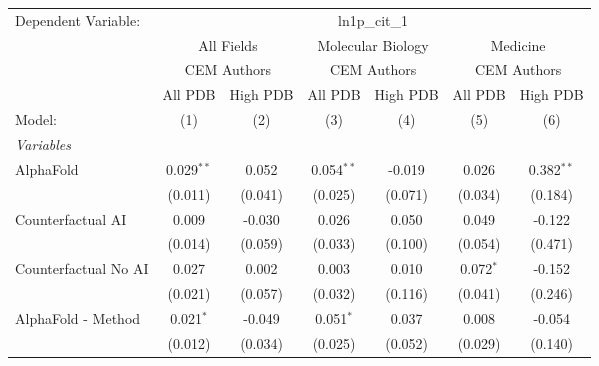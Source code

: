 \begingroup
\centering
\begin{tabular}{lcccccc}
   \tabularnewline \midrule \midrule
   Dependent Variable: & \multicolumn{6}{c}{ln1p\_cit\_1}\\
 & \multicolumn{2}{c}{All Fields} & \multicolumn{2}{c}{Molecular Biology} & \multicolumn{2}{c}{Medicine} \\
\cmidrule(lr){2-3} \cmidrule(lr){4-5} \cmidrule(lr){6-7}
 & \multicolumn{2}{c}{CEM Authors} & \multicolumn{2}{c}{CEM Authors} & \multicolumn{2}{c}{CEM Authors} \\
\cmidrule(lr){2-3} \cmidrule(lr){4-5} \cmidrule(lr){6-7}
 & \multicolumn{1}{c}{All PDB} & \multicolumn{1}{c}{High PDB} & \multicolumn{1}{c}{All PDB} & \multicolumn{1}{c}{High PDB} & \multicolumn{1}{c}{All PDB} & \multicolumn{1}{c}{High PDB} \\
\cmidrule(lr){2-2} \cmidrule(lr){3-3} \cmidrule(lr){4-4} \cmidrule(lr){5-5} \cmidrule(lr){6-6} \cmidrule(lr){7-7}
   Model:                                                     & (1)          & (2)     & (3)          & (4)          & (5)           & (6)\\  
   \midrule
   \emph{Variables}\\
   AlphaFold                                                  & 0.029$^{**}$ & 0.052   & 0.054$^{**}$ & -0.019       & 0.026         & 0.382$^{**}$\\   
                                                              & (0.011)      & (0.041) & (0.025)      & (0.071)      & (0.034)       & (0.184)\\   
   Counterfactual AI                                          & 0.009        & -0.030  & 0.026        & 0.050        & 0.049         & -0.122\\   
                                                              & (0.014)      & (0.059) & (0.033)      & (0.100)      & (0.054)       & (0.471)\\   
   Counterfactual No AI                                       & 0.027        & 0.002   & 0.003        & 0.010        & 0.072$^{*}$   & -0.152\\   
                                                              & (0.021)      & (0.057) & (0.032)      & (0.116)      & (0.041)       & (0.246)\\   
   AlphaFold - Method                                         & 0.021$^{*}$  & -0.049  & 0.051$^{*}$  & 0.037        & 0.008         & -0.054\\   
                                                              & (0.012)      & (0.034) & (0.025)      & (0.052)      & (0.029)       & (0.140)\\   

\end{tabular}
